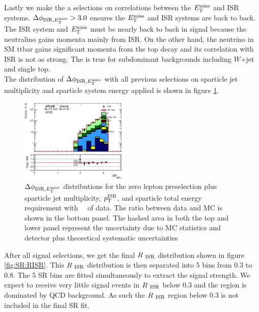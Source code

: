 \indent Lastly we make the a selections on correlations between the $E_{\mathrm{T}}^{\mathrm{miss}}$ and ISR systems.  $\Delta\phi_{\mathrm{ISR},E_{\mathrm{T}}^{\mathrm{miss}}} > 3.0$ ensures the $E_{\mathrm{T}}^{\mathrm{miss}}$ and ISR systems are back to back.  The ISR system and $E_{\mathrm{T}}^{\mathrm{miss}}$ must be nearly back to back in signal because the neutralino gains momenta mainly from ISR.  On the other hand, the neutrino in SM ttbar gains significant momenta from the top decay and its correlation with ISR is not as strong. The is true for subdominant backgrounds including $W$+jet and single top. \\

\indent The distribution of $\Delta\phi_{\mathrm{ISR},E_{\mathrm{T}}^{\mathrm{miss}}}$ with all previous selections on sparticle jet multiplicity and sparticle system energy applied is shown in figure \ref{fig:SR:dphiISRMET}.   %

\begin{figure}[htbp]
  \begin{center}
     \includegraphics[width=0.45\textwidth]{figures/ttbar/postfit/CA_dphiISRI_CRTopC_log}
  \end{center}
  \caption{$\Delta\phi_{\mathrm{ISR},E_{\mathrm{T}}^{\mathrm{miss}}}$ distributions for the zero lepton preselection plus sparticle jet multiplicity, $p_{\mathrm{T}}^{\mathrm{ISR}}$, and sparticle total energy requirement with \intlumi\ \ifb\ of data. The ratio between data and MC is shown in the bottom panel. The hashed area in both the top and lower panel represent the uncertainty due to MC statistics and detector plus theoretical systematic uncertainties}
  \label{fig:SR:dphiISRMET}
\end{figure}

\indent After all signal selections, we get the final $R_{~\mathrm{ISR}}$ distribution shown in figure \ref{fig:SR:RISR}.  This $R_{~\mathrm{ISR}}$ distribution is then separated into $5$ bins from $0.3$ to $0.8$.  The 5 SR bins are fitted simultaneously to extract the signal strength.  We expect to receive very little signal events in $R_{~\mathrm{ISR}}$ below 0.3 and the region is dominated by QCD background.  As such the $R_{~\mathrm{ISR}}$ region below 0.3 is not included in the final SR fit.  \\

